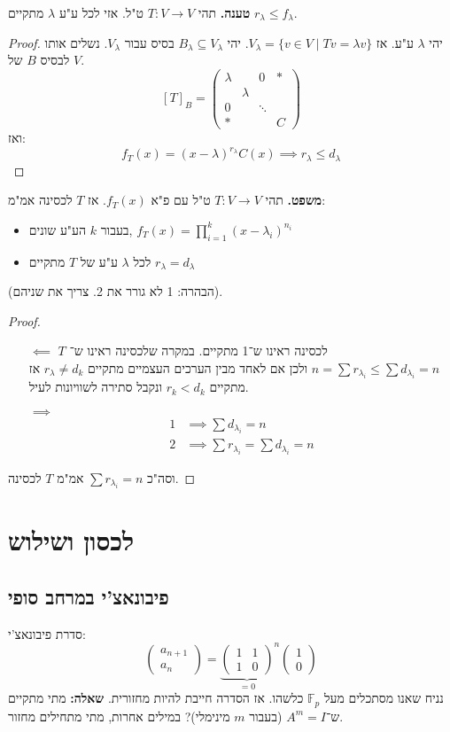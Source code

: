 \documentclass[]{article}
\newcommand\F         {\mathbb{F}}
\newcommand\co        {\colon}
\newcommand\pms[1]    {\begin{pmatrix}
		#1
\end{pmatrix}}
\renewcommand\lg      {\lambda}
\theoremstyle{definition}
\begin{document}
	\textbf{טענה. }תהי $T \co V \to V$ ט"ל. אזי לכל ע"ע $\lg$ מתקיים $r_\lg \le f_\lg$. 
	\begin{proof}
		יהי $\lg$ ע"ע. אז $V_\lg = \{v \in V \mid Tv = \lg v\}$. יהי $B_\lg \subseteq V_\lg$ בסיס עבור $V_\lg$. נשלים אותו לבסיס $B$ של $V$. 
		\[ [T]_B = \pms{\lg & & 0 & * \\ & \lg &  & \\ 0 && \ddots & \\ *&&& C} \]
		ואז: 
		\[ f_T(x) = (x - \lg)^{r_\lg}C(x) \implies r_\lg \le d_\lg \]
	\end{proof}
	
	\textbf{משפט. }תהי $T \co V \to V$ ט"ל עם פ"א $f_T(x)$. אז $T$ לכסינה אמ"מ: 
	\begin{itemize}
		\item בעבור $k$ הע"ע שונים, $f_T(x) = \prod_{i = 1}^{k}(x - \lg_i)^{n_i}$
		\item לכל $\lg$ ע"ע של $T$ מתקיים $r_\lg = d_\lg$
	\end{itemize}
	(הבהרה: 1 לא גורר את 2. צריך את שניהם). 
	
	\begin{proof}\,
		\begin{itemize}
			\item[$\impliedby$]$T$ לכסינה ראינו ש־1 מתקיים. במקרה שלכסינה ראינו ש־$n = \sum r_{\lg_i} \le \sum d_{\lg_i} = n$ ולכן אם לאחד מבין הערכים העצמיים מתקיים $r_\lg \neq d_k$ אז מתקיים $r_k < d_k$ ונקבל סתירה לשוויונות  לעיל. 
			\item[$\implies$] 
			\begin{align*}
				1 &\implies \sum d_{\lg_i} = n \\
				2 &\implies \sum r_{\lg_i} = \sum d_{\lg_i} = n
			\end{align*}
		\end{itemize}
		וסה"כ $\sum r_{\lg_i} = n$ אמ"מ $T$ לכסינה. 
	\end{proof}
	
	\section{לכסון ושילוש}
	\subsection{פיבונאצ'י במרחב סופי}
	סדרת פיבונאצ'י: 
	\[ \pms{a_{n + 1} \\ a_n} = {\underbrace{\pms{1 & 1 \\ 1 & 0}}_{ = 0}}^{n}\pms{1 \\ 0} \]
	נניח שאנו מסתכלים מעל $\F_p$ כלשהו. אז הסדרה חייבת להיות מחזורית. \textbf{שאלה: }מתי מתקיים ש־$A^m = I$ (בעבור $m$ מינימלי)? במילים אחרות, מתי מתחילים מחזור. 
	
\end{document}
